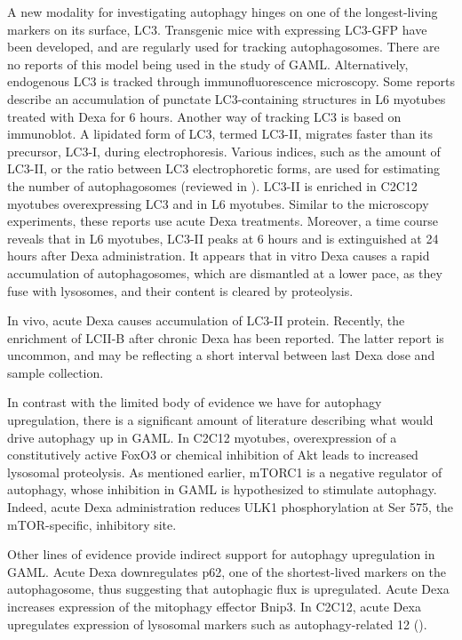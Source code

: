 \documentclass[12pt,english]{report}\usepackage[]{graphicx}\usepackage[]{color}
\begin{document}
A new modality for investigating autophagy hinges on one of the longest-living
markers on its surface, LC3. Transgenic mice with expressing LC3-GFP
have been developed, and are regularly used for tracking autophagosomes.
There are no reports of this model being used in the study of GAML.
Alternatively, endogenous LC3 is tracked through immunofluorescence
microscopy. Some reports describe an accumulation of punctate LC3-containing
structures in L6 myotubes treated with Dexa for 6 hours\citep{giron2015beta-hydroxy-beta-methylbutyrate}.
Another way of tracking LC3 is based on immunoblot. A lipidated form
of LC3, termed LC3-II, migrates faster than its precursor, LC3-I,
during electrophoresis. Various indices, such as the amount of LC3-II,
or the ratio between LC3 electrophoretic forms, are used for estimating
the number of autophagosomes (reviewed in \citep{mizushima2007how}).
LC3-II is enriched in C2C12 myotubes overexpressing LC3\citep{rossi2009cytosolic}
and in L6 myotubes\citep{giron2015beta-hydroxy-beta-methylbutyrate}.
Similar to the microscopy experiments, these reports use acute Dexa
treatments. Moreover, a time course reveals that in L6 myotubes, LC3-II
peaks at 6 hours and is extinguished at 24 hours after Dexa administration\citep{troncoso2014dexamethasone-induced}.
It appears that in vitro Dexa causes a rapid accumulation of autophagosomes,
which are dismantled at a lower pace, as they fuse with lysosomes,
and their content is cleared by proteolysis.

In vivo, acute Dexa causes accumulation of LC3-II protein\citep{britto2014redd1}.
Recently, the enrichment of LCII-B after chronic Dexa has been reported\citep{yamamoto2010branched-chain}.
The latter report is uncommon, and may be reflecting a short interval
between last Dexa dose and sample collection.

In contrast with the limited body of evidence we have for autophagy
upregulation, there is a significant amount of literature describing
what would drive autophagy up in GAML. In C2C12 myotubes, overexpression
of a constitutively active FoxO3 or chemical inhibition of Akt leads
to increased lysosomal proteolysis\citep{zhao2007foxo3}. As mentioned
earlier, mTORC1 is a negative regulator of autophagy, whose inhibition
in GAML is hypothesized to stimulate autophagy. Indeed, acute Dexa
administration reduces ULK1 phosphorylation at Ser 575, the mTOR-specific,
inhibitory site\citep{britto2014redd1}.

Other lines of evidence provide indirect support for autophagy upregulation
in GAML. Acute Dexa downregulates p62, one of the shortest-lived markers
on the autophagosome, thus suggesting that autophagic flux is upregulated\citep{britto2014redd1}.
Acute Dexa increases expression of the mitophagy effector Bnip3\citep{britto2014redd1,giron2015beta-hydroxy-beta-methylbutyrate}.
In C2C12, acute Dexa upregulates expression of lysosomal markers such
as autophagy-related 12 ()\citep{hudson2014mir-182}.
\end{document}
